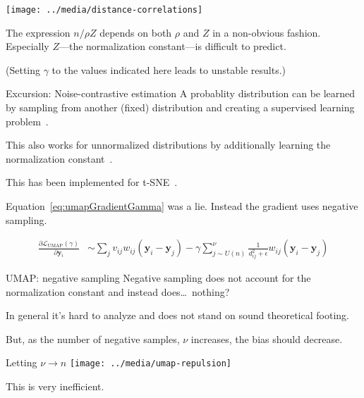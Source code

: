 \documentclass{beamer}
\begin{document}
\begin{frame}{}
  \texttt{[image: ../media/distance-correlations]}

  \bigskip\pause The expression $n/\rho Z$ depends on both $\rho$ and
  $Z$ in a non-obvious fashion.  Especially $Z$---the normalization
  constant---is difficult to predict.

  \bigskip\pause (Setting $\gamma$ to the values indicated here leads
  to unstable results.)
\end{frame}

\begin{frame}{Excursion: Noise-contrastive estimation}
  A probablity distribution can be learned by sampling from another
  (fixed) distribution and creating a supervised learning
  problem~\citep{hastie2009elements}.

  \bigskip\pause This also works for unnormalized distributions by
  additionally learning the normalization
  constant~\citep{gutmann12nce}.

  This has been implemented for t-SNE~\citep{artemenkov2020ncvis}.
\end{frame}

\begin{frame}
  Equation~\ref{eq:umapGradientGamma} was a lie.  Instead the gradient
  uses negative sampling.

  \begin{align}
    \frac{\partial \mathcal L_{\textrm{UMAP}}(\gamma)}{\partial
    \mathbf y_i} &\sim \sum_j v_{ij}w_{ij}(\mathbf y_i-\mathbf y_j) -
                   \gamma \sum_{j\sim U(n)}^\nu \frac{1}{d_{ij}^2 +\epsilon}w_{ij}(\mathbf y_i-\mathbf y_j)
  \end{align}
\end{frame}

\begin{frame}{UMAP: negative sampling}
  Negative sampling does not account for the normalization constant
  and instead does\dots\pause\ nothing?

  \bigskip\pause In general it's hard to analyze and does not stand on
  sound theoretical footing.

  \bigskip\pause But, as the number of negative samples, $\nu$
  increases, the bias should decrease.
\end{frame}

\begin{frame}{Letting $\nu\to n$}
  \texttt{[image: ../media/umap-repulsion]}

  \bigskip\pause This is very inefficient.
\end{frame}
\end{document}
